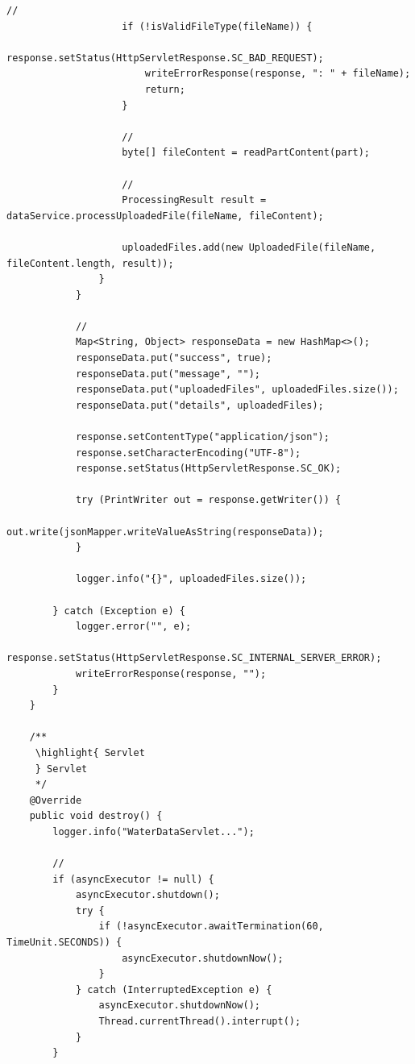 \begin{lstlisting}[style=java]
                    // 
                    if (!isValidFileType(fileName)) {
                        response.setStatus(HttpServletResponse.SC_BAD_REQUEST);
                        writeErrorResponse(response, ": " + fileName);
                        return;
                    }
                    
                    // 
                    byte[] fileContent = readPartContent(part);
                    
                    // 
                    ProcessingResult result = dataService.processUploadedFile(fileName, fileContent);
                    
                    uploadedFiles.add(new UploadedFile(fileName, fileContent.length, result));
                }
            }
            
            // 
            Map<String, Object> responseData = new HashMap<>();
            responseData.put("success", true);
            responseData.put("message", "");
            responseData.put("uploadedFiles", uploadedFiles.size());
            responseData.put("details", uploadedFiles);
            
            response.setContentType("application/json");
            response.setCharacterEncoding("UTF-8");
            response.setStatus(HttpServletResponse.SC_OK);
            
            try (PrintWriter out = response.getWriter()) {
                out.write(jsonMapper.writeValueAsString(responseData));
            }
            
            logger.info("{}", uploadedFiles.size());
            
        } catch (Exception e) {
            logger.error("", e);
            response.setStatus(HttpServletResponse.SC_INTERNAL_SERVER_ERROR);
            writeErrorResponse(response, "");
        }
    }
    
    /**
     \highlight{ Servlet
     } Servlet
     */
    @Override
    public void destroy() {
        logger.info("WaterDataServlet...");
        
        // 
        if (asyncExecutor != null) {
            asyncExecutor.shutdown();
            try {
                if (!asyncExecutor.awaitTermination(60, TimeUnit.SECONDS)) {
                    asyncExecutor.shutdownNow();
                }
            } catch (InterruptedException e) {
                asyncExecutor.shutdownNow();
                Thread.currentThread().interrupt();
            }
        }
        

\end{lstlisting}
